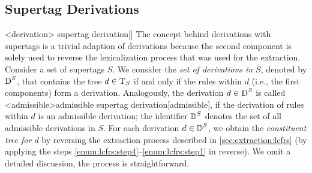 \documentclass[../../document.tex]{subfiles}
\begin{document}
    \subsection*{ Supertag Derivations}
    <derivation>{ supertag derivation}[]
    The concept behind derivations with  supertags is a trivial adaption of  derivations because the second component is solely used to reverse the lexicalization process that was used for the extraction.
    Consider a set of  supertags \(S\).
    We consider the \emph{set of derivations in \(S\)}, denoted by \(\operatorname{D}^S\), that contains the tree \(d \in \operatorname{T}_S\) if and only if the  rules within \(d\) (i.e., the first components) form a derivation.
    Analogously, the derivation \(d\in \operatorname{D}^S\) is called <admissible>{admissible  supertag derivation}[admissible], if the derivation of  rules within \(d\) is an admissible derivation; the identifier \(\operatorname{\mathbb{D}}^S\) denotes the set of all admissible derivations in \(S\).
    For each derivation \(d \in \operatorname{\mathbb{D}}^S\), we obtain the \emph{constituent tree for \(d\)} by reversing the extraction process described in \cref{sec:extraction:lcfrs} (by applying the steps \ref{enum:lcfrs:step4}--\ref{enum:lcfrs:step1} in reverse).
    We omit a detailed discussion, the process is straightforward.
\end{document}
